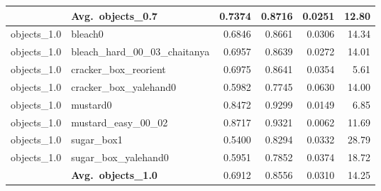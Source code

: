 \begin{longtable}{llrrrr}
  \cmidrule{2-6}
  & \textbf{Avg.~objects_0.7} & 0.7374 & 0.8716 & 0.0251 & 12.80 \\
  \midrule
  objects_1.0 & bleach0 & 0.6846 & 0.8661 & 0.0306 & 14.34 \\
  objects_1.0 & bleach\_hard\_00\_03\_chaitanya & 0.6957 & 0.8639 & 0.0272 & 14.01 \\
  objects_1.0 & cracker\_box\_reorient & 0.6975 & 0.8641 & 0.0354 & 5.61 \\
  objects_1.0 & cracker\_box\_yalehand0 & 0.5982 & 0.7745 & 0.0630 & 14.00 \\
  objects_1.0 & mustard0 & 0.8472 & 0.9299 & 0.0149 & 6.85 \\
  objects_1.0 & mustard\_easy\_00\_02 & 0.8717 & 0.9321 & 0.0062 & 11.69 \\
  objects_1.0 & sugar\_box1 & 0.5400 & 0.8294 & 0.0332 & 28.79 \\
  objects_1.0 & sugar\_box\_yalehand0 & 0.5951 & 0.7852 & 0.0374 & 18.72 \\
  \cmidrule{2-6}
  & \textbf{Avg.~objects_1.0} & 0.6912 & 0.8556 & 0.0310 & 14.25 \\
  \midrule
\bottomrule
\end{longtable}